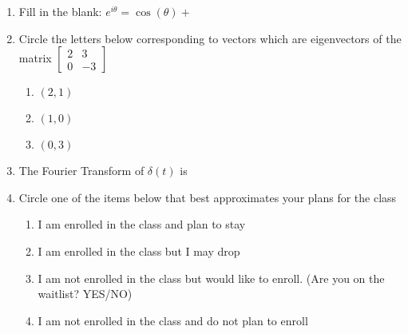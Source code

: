 \documentclass{article}
\begin{document}
\begin{spacing}{1.1}
\begin{enumerate}
\item

Fill in the blank: $ e^{i \theta} = \cos(\theta) + $ \underline{\hspace{3cm}} \\

\item
Circle the letters below corresponding to vectors which are eigenvectors of the matrix $ \left[ \begin{array}{cc} 2 & 3 \\ 0 & -3 \end{array} \right]$

\begin{enumerate}[label=\alph*.]

\item $(2, 1)$

\item $(1, 0)$

\item $(0, 3)$

\end{enumerate}


\item
The Fourier Transform of $\delta(t)$ is \underline{\hspace{3cm}} \\

\item
Circle one of the items below that best approximates your plans for the class

\begin{enumerate}[label=\alph*.]

\item I am enrolled in the class and plan to stay

\item I am enrolled in the class but I may drop

\item I am not enrolled in the class but would like to enroll. (Are you on the waitlist?  YES/NO)

\item I am not enrolled in the class and do not plan to enroll

\end{enumerate}



\end{enumerate}

\end{spacing}
\end{document}
